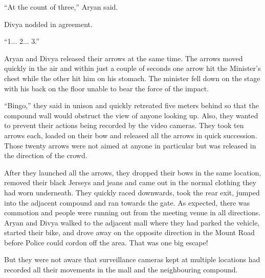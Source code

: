 “At the count of three,” Aryan said.

Divya nodded in agreement.

“1... 2... 3.”

Aryan and Divya released their arrows at the same time. The arrows moved quickly
in the air and within just a couple of seconds one arrow hit the Minister's
chest while the other hit him on his stomach. The minister fell down on the
stage with his back on the floor unable to bear the force of the impact.

“Bingo,” they said in unison and quickly retreated five meters behind so that
the compound wall would obstruct the view of anyone looking up. Also, they
wanted to prevent their actions being recorded by the video cameras. They took
ten arrows each, loaded on their bow and released all the arrows in quick
succession. Those twenty arrows were not aimed at anyone in particular but was
released in the direction of the crowd.

After they launched all the arrows, they dropped their bows in the same
location, removed their black Jerseys and jeans and came out in the normal
clothing they had worn underneath. They quickly raced downwards, took the rear
exit, jumped into the adjacent compound and ran towards the gate. As expected,
there was commotion and people were running out from the meeting venue in all
directions. Aryan and Divya walked to the adjacent mall where they had parked
the vehicle, started their bike, and drove away on the opposite direction in the
Mount Road before Police could cordon off the area. That was one big escape!

But they were not aware that surveillance cameras kept at multiple locations had
recorded all their movements in the mall and the neighbouring compound.
